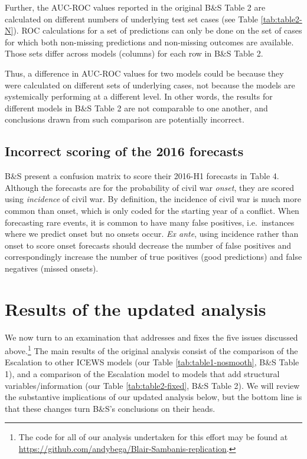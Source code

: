 \documentclass[
]{article}
\begin{document}
Further, the AUC-ROC values reported in the original B\&S Table 2 are calculated on different numbers of underlying test set cases (see Table \ref{tab:table2-N}). ROC calculations for a set of predictions can only be done on the set of cases for which both non-missing predictions and non-missing outcomes are available. Those sets differ across models (columns) for each row in B\&S Table 2.

Thus, a difference in AUC-ROC values for two models could be because they were calculated on different sets of underlying cases, not because the models are systemically performing at a different level. In other words, the results for different models in B\&S Table 2 are not comparable to one another, and conclusions drawn from such comparison are potentially incorrect.

\hypertarget{incorrect-scoring-of-the-2016-forecasts}{%
\subsection{Incorrect scoring of the 2016 forecasts}\label{incorrect-scoring-of-the-2016-forecasts}}

B\&S present a confusion matrix to score their 2016-H1 forecasts in Table 4. Although the forecasts are for the probability of civil war \emph{onset}, they are scored using \emph{incidence} of civil war. By definition, the incidence of civil war is much more common than onset, which is only coded for the starting year of a conflict. When forecasting rare events, it is common to have many false positives, i.e.~instances where we predict onset but no onsets occur. \emph{Ex ante}, using incidence rather than onset to score onset forecasts should decrease the number of false positives and correspondingly increase the number of true positives (good predictions) and false negatives (missed onsets).

\hypertarget{results-of-the-updated-analysis}{%
\section{Results of the updated analysis}\label{results-of-the-updated-analysis}}

We now turn to an examination that addresses and fixes the five issues discussed above.\footnote{The code for all of our analysis undertaken for this effort may be found at \url{https://github.com/andybega/Blair-Sambanis-replication}.} The main results of the original analysis consist of the comparison of the Escalation to other ICEWS models (our Table \ref{tab:table1-nosmooth}, B\&S Table 1), and a comparison of the Escalation model to models that add structural variables/information (our Table \ref{tab:table2-fixed}, B\&S Table 2). We will review the substantive implications of our updated analysis below, but the bottom line is that these changes turn B\&S's conclusions on their heads.
\end{document}
